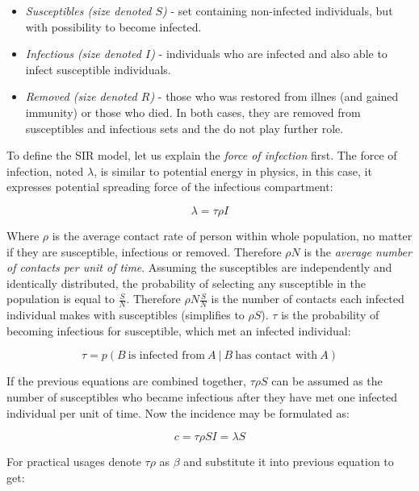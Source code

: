 \documentclass[
  digital, %
  oneside, %
  lof,     %
  lot,     %
]{fithesis4}
\begin{document}
\begin{itemize}
  \item \textit{Susceptibles (size denoted $S$)} - set containing non-infected individuals, but with possibility to become infected.
  \item \textit{Infectious (size denoted $I$)} - individuals who are infected and also able to infect susceptible individuals.
  \item \textit{Removed (size denoted $R$)} - those who was restored from illnes (and gained immunity) or those who died. In both cases, they are removed from susceptibles and infectious sets and the do not play further role.
\end{itemize}

To define the SIR model, let us explain the \textit{force of infection} first.
The force of infection, noted $\lambda$, is similar to 
potential energy in physics, in this case, it expresses 
potential spreading force of the infectious compartment:

\begin{equation}
	\lambda = \tau \rho I
\end{equation}

Where $\rho$ is the average contact rate of person within whole 
population, no matter if they are susceptible, infectious 
or removed. Therefore $\rho N$ is the \textit{average number 
of contacts per unit of time}.
Assuming the susceptibles are independently and identically 
distributed, the probability of selecting any susceptible 
in the population is equal to $\frac{S}{N}$.
Therefore $\rho N\frac{S}{N}$ is the number of contacts 
each infected individual makes with susceptibles 
(simplifies to $\rho S$).
$\tau$ is the probability of becoming infectious for 
susceptible, which met an infected individual:

\begin{equation}
	\tau = p \left( B~\textrm{is infected from}~A~|~B~\textrm{has contact with}~A \right)
\end{equation}

If the previous equations are combined together, 
$\tau \rho S$ can be assumed as the number of 
susceptibles who became infectious after they have 
met one infected individual per unit of time.
Now the incidence may be formulated as:

\begin{equation}
	c = \tau \rho S I = \lambda S
\end{equation}

For practical usages denote $\tau \rho$ as $\beta$ 
and substitute it into previous equation to get:
\end{document}
